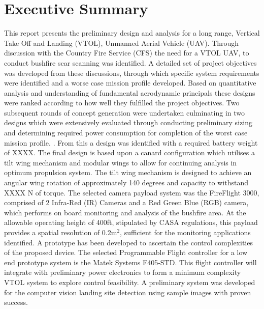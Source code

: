 \section*{Executive Summary}

This report presents the preliminary design and analysis for a long range, Vertical Take Off and Landing (VTOL), Unmanned Aerial Vehicle (UAV). Through discussion with the Country Fire Service (CFS) the need for a VTOL UAV, to conduct bushfire scar scanning was identified. A detailed set of project objectives was developed from these discussions, through which specific system requirements were identified and a worse case mission profile developed. Based on quantitative analysis and understanding of fundamental aerodynamic principals these designs were ranked according to how well they fulfilled the project objectives. Two subsequent rounds of concept generation were undertaken culminating in two designs which were extensively evaluated through conducting preliminary sizing and determining required power consumption for completion of the worst case mission profile. . From this a design was identified with a required battery weight of XXXX. The final design is based upon a canard configuration which utilises a tilt wing mechanism and modular wings to allow for continuing analysis in optimum propulsion system. The tilt wing mechanism is designed to achieve an angular wing rotation of approximately 140 degrees and capacity to withstand XXXX N of torque. The selected camera payload system was the FireFlight 3000, comprised of 2 Infra-Red (IR) Cameras and a Red Green Blue (RGB) camera, which performs on board monitoring and analysis of the bushfire area. At the allowable operating height of 400ft, stipulated by CASA regulations, this payload provides a spatial resolution of {0.2m$^2$}, sufficient for the monitoring applications identified. A prototype has been developed to ascertain the control complexities of the proposed device. The selected Programmable Flight controller for a low end prototype system is the Matek Systems F405-STD. This flight controller will integrate with preliminary power electronics to form a minimum complexity VTOL system to explore control feasibility. A preliminary system was developed for the computer vision landing site detection using sample images with proven success. 

